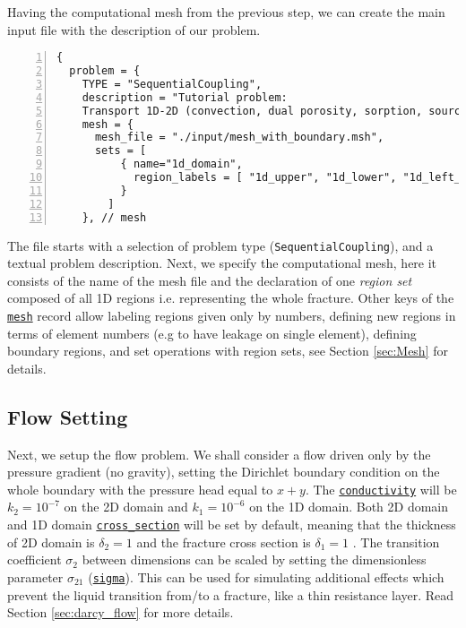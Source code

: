 Having the computational mesh from the previous step, we can create the main input file with the description of our problem. 
\begin{Verbatim}[numbers=left]
{
  problem = {
    TYPE = "SequentialCoupling", 
    description = "Tutorial problem: 
    Transport 1D-2D (convection, dual porosity, sorption, sources).", 
    mesh = {
      mesh_file = "./input/mesh_with_boundary.msh",
      sets = [
          { name="1d_domain", 
            region_labels = [ "1d_upper", "1d_lower", "1d_left_branch" ]
          }
        ]
    }, // mesh
\end{Verbatim}
The file starts with a selection of problem type (\verb'SequentialCoupling'), and a textual problem description.
Next, we specify the computational mesh, here it consists of the name of the mesh file and the declaration of one {\it region set} 
composed of all 1D regions i.e. representing the whole fracture. Other keys of the \hyperlink{IT::Mesh}{\tt mesh} record allow labeling regions given only by numbers, 
defining new regions in terms of element numbers (e.g to have leakage on single element), 
defining boundary regions, and set operations with region sets, see Section \ref{sec:Mesh} for details.

\subsection{Flow Setting}
Next, we setup the flow problem. We shall consider a flow driven only by the pressure gradient (no gravity),
setting the Dirichlet boundary condition on the whole boundary with the pressure head equal to $x+y$. 
The \hyperlink{DarcyFlowMH-Data::conductivity::B}{\tt conductivity} will be $k_2=10^{-7}$  on the 2D domain and $k_1=10^{-6}$  on the 1D domain.
Both 2D domain and 1D domain \hyperlink{DarcyFlowMH-Data::cross-section::B}{\tt cross\_section} will be set by default,
meaning that the thickness of 2D domain is $\delta_2=1$  and the fracture cross section is $\delta_1=1$ .
The transition coefficient $\sigma_2$ between dimensions can be scaled by setting the dimensionless parameter 
$\sigma_{21}$ (\hyperlink{DarcyFlowMH-Data::sigma::B}{\tt sigma}). This can be used for simulating additional
effects which prevent the liquid transition from/to a fracture, like a thin resistance layer. Read Section 
\ref{sec:darcy_flow} for more details.

